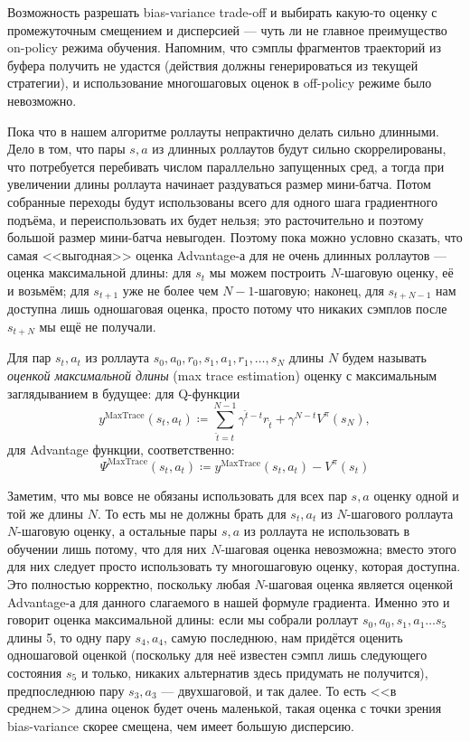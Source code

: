 Возможность разрешать bias-variance trade-off и выбирать какую-то оценку с промежуточным смещением и дисперсией --- чуть ли не главное преимущество on-policy режима обучения. Напомним, что сэмплы фрагментов траекторий из буфера получить не удастся (действия должны генерироваться из текущей стратегии), и использование многошаговых оценок в off-policy режиме было невозможно.

Пока что в нашем алгоритме роллауты непрактично делать сильно длинными. Дело в том, что пары $s, a$ из длинных роллаутов будут сильно скоррелированы, что потребуется перебивать числом параллельно запущенных сред, а тогда при увеличении длины роллаута начинает раздуваться размер мини-батча. Потом собранные переходы будут использованы всего для одного шага градиентного подъёма, и переиспользовать их будет нельзя; это расточительно и поэтому большой размер мини-батча невыгоден. Поэтому пока можно условно сказать, что самая <<выгодная>> оценка Advantage-а для не очень длинных роллаутов --- оценка максимальной длины: для $s_t$ мы можем построить $N$-шаговую оценку, её и возьмём; для $s_{t+1}$ уже не более чем $N-1$-шаговую; наконец, для $s_{t+N-1}$ нам доступна лишь одношаговая оценка, просто потому что никаких сэмплов после $s_{t+N}$ мы ещё не получали. 

\begin{definition}
Для пар $s_t, a_t$ из роллаута $s_0, a_0, r_0, s_1, a_1, r_1, \dots, s_N$ длины $N$ будем называть \emph{оценкой максимальной длины} (max trace estimation) оценку с максимальным заглядыванием в будущее: для Q-функции
\begin{equation}\label{maxtrace}
y^{\mathrm{MaxTrace}} (s_t, a_t) \coloneqq \sum_{\hat{t}=t}^{N-1} \gamma^{\hat{t}-t} r_{\hat{t}} + \gamma^{N-t} V^\pi(s_N),
\end{equation}
для Advantage функции, соответственно:
\begin{equation*}\label{maxtraceadvantage}
\Psi^{\mathrm{MaxTrace}} (s_t, a_t) \coloneqq y^{\mathrm{MaxTrace}} (s_t, a_t) - V^\pi(s_t)
\end{equation*}
\end{definition}

Заметим, что мы вовсе не обязаны использовать для всех пар $s, a$ оценку одной и той же длины $N$. То есть мы не должны брать для $s_t, a_t$ из $N$-шагового роллаута $N$-шаговую оценку, а остальные пары $s, a$ из роллаута не использовать в обучении лишь потому, что для них $N$-шаговая оценка невозможна; вместо этого для них следует просто использовать ту многошаговую оценку, которая доступна. Это полностью корректно, поскольку любая $N$-шаговая оценка является оценкой Advantage-а для данного слагаемого в нашей формуле градиента. Именно это и говорит оценка максимальной длины: если мы собрали роллаут $s_0, a_0, s_1, a_1 \dots s_5$ длины 5, то одну пару $s_4, a_4$, самую последнюю, нам придётся оценить одношаговой оценкой (поскольку для неё известен сэмпл лишь следующего состояния $s_5$ и только, никаких альтернатив здесь придумать не получится), предпоследнюю пару $s_3, a_3$ --- двухшаговой, и так далее. То есть <<в среднем>> длина оценок будет очень маленькой, такая оценка с точки зрения bias-variance скорее смещена, чем имеет большую дисперсию. 

